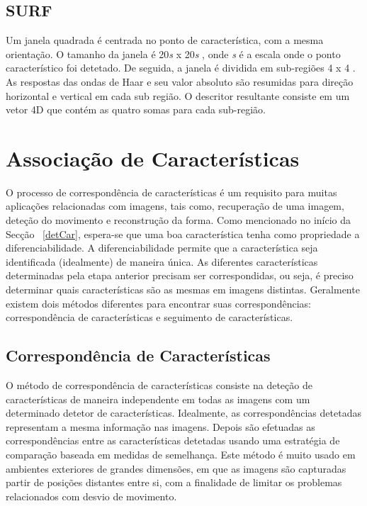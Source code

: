 \subsection{SURF}

Um janela quadrada é centrada no ponto de característica, com a mesma orientação. O tamanho da janela é 20\textit{s} x 20\textit{s} , onde \textit{s} é a escala onde o ponto característico foi detetado. De seguida, a janela é dividida em sub-regiões 4 x 4 . As respostas das ondas de Haar e seu valor absoluto são resumidas para direção horizontal e vertical em cada sub região. O descritor resultante consiste em um vetor 4D que contém as quatro somas para cada sub-região.


\section{Associação de Características}

O processo de correspondência de características é um requisito para muitas aplicações relacionadas com imagens, tais como, recuperação de uma imagem, deteção do movimento e reconstrução da forma. 
Como mencionado no início da Secção ~\ref{detCar}, espera-se que uma boa característica tenha como propriedade a diferenciabilidade. A diferenciabilidade permite que a característica seja identificada (idealmente) de maneira única.
As diferentes características determinadas pela etapa anterior precisam ser correspondidas, ou seja, é preciso determinar quais características são as mesmas em imagens distintas. Geralmente existem dois métodos diferentes para encontrar suas correspondências: correspondência de características e seguimento de características. 


\subsection{Correspondência de Características}

O método de correspondência de características consiste na deteção de características de maneira independente em todas as imagens com um determinado detetor de características.
Idealmente, as correspondências detetadas representam a mesma informação nas imagens.
Depois são efetuadas as correspondências entre as características detetadas usando uma estratégia de comparação baseada em medidas de semelhança.
Este método é muito usado em ambientes exteriores de grandes dimensões, em que as imagens são capturadas partir de posições distantes entre si, com a finalidade de limitar os problemas relacionados com desvio de movimento.


